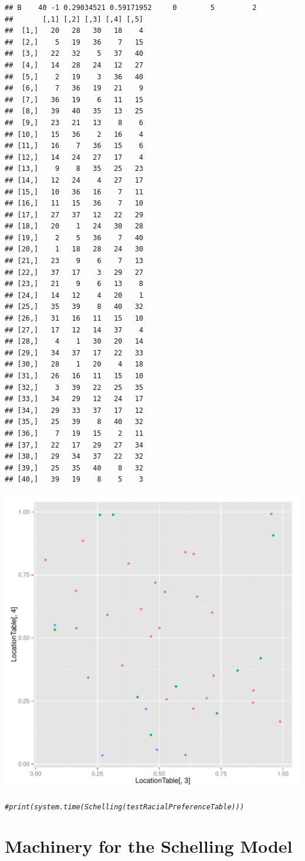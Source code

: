 \documentclass{article}\usepackage[]{graphicx}\usepackage[]{color}
\makeatletter
\def\maxwidth{ %
  \ifdim\Gin@nat@width>\linewidth
    \linewidth
  \else
    \Gin@nat@width
  \fi
}
\newcommand{\hlcom}[1]{\textcolor[rgb]{0.678,0.584,0.686}{\textit{#1}}}%
\newenvironment{kframe}{%
 \def\at@end@of@kframe{}%
 \ifinner\ifhmode%
  \def\at@end@of@kframe{\end{minipage}}%
  \begin{minipage}{\columnwidth}%
 \fi\fi%
 \def\FrameCommand##1{\hskip\@totalleftmargin \hskip-\fboxsep
 \colorbox{shadecolor}{##1}\hskip-\fboxsep
     \hskip-\linewidth \hskip-\@totalleftmargin \hskip\columnwidth}%
 \MakeFramed {\advance\hsize-\width
   \@totalleftmargin\z@ \linewidth\hsize
   \@setminipage}}%
 {\par\unskip\endMakeFramed%
 \at@end@of@kframe}
\newenvironment{knitrout}{}{} %
\makeatother
\begin{document}
\begin{knitrout}
\begin{kframe}
\begin{verbatim}
## B    40 -1 0.29034521 0.59171952     0        5         2
##       [,1] [,2] [,3] [,4] [,5]
##  [1,]   20   28   30   18    4
##  [2,]    5   19   36    7   15
##  [3,]   22   32    5   37   40
##  [4,]   14   28   24   12   27
##  [5,]    2   19    3   36   40
##  [6,]    7   36   19   21    9
##  [7,]   36   19    6   11   15
##  [8,]   39   40   35   13   25
##  [9,]   23   21   13    8    6
## [10,]   15   36    2   16    4
## [11,]   16    7   36   15    6
## [12,]   14   24   27   17    4
## [13,]    9    8   35   25   23
## [14,]   12   24    4   27   17
## [15,]   10   36   16    7   11
## [16,]   11   15   36    7   10
## [17,]   27   37   12   22   29
## [18,]   20    1   24   30   28
## [19,]    2    5   36    7   40
## [20,]    1   18   28   24   30
## [21,]   23    9    6    7   13
## [22,]   37   17    3   29   27
## [23,]   21    9    6   13    8
## [24,]   14   12    4   20    1
## [25,]   35   39    8   40   32
## [26,]   31   16   11   15   10
## [27,]   17   12   14   37    4
## [28,]    4    1   30   20   14
## [29,]   34   37   17   22   33
## [30,]   28    1   20    4   18
## [31,]   26   16   11   15   10
## [32,]    3   39   22   25   35
## [33,]   34   29   12   24   17
## [34,]   29   33   37   17   12
## [35,]   25   39    8   40   32
## [36,]    7   19   15    2   11
## [37,]   22   17   29   27   34
## [38,]   29   34   37   22   32
## [39,]   25   35   40    8   32
## [40,]   39   19    8    5    3
\end{verbatim}


{\ttfamily\noindent\bfseries\color{errorcolor}{\#\# Error: object 'bad\_neighbors' not found}}\end{kframe}
\includegraphics[width=\maxwidth]{figure/unnamed-chunk-2-1} 
\begin{kframe}\begin{alltt}
\hlcom{# print(system.time(Schelling(testRacialPreferenceTable)))}
\end{alltt}
\end{kframe}
\end{knitrout}

\section{Machinery for the Schelling Model}
\end{document}
